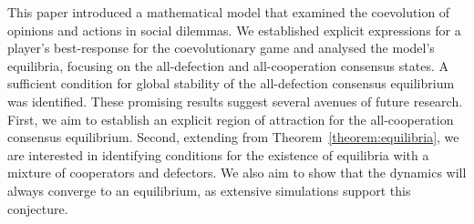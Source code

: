 \documentclass[letterpaper, 10 pt, conference]{ieeeconf}  %
\begin{document}
This paper introduced a mathematical model that examined the coevolution of opinions and actions in social dilemmas. We established explicit expressions for a player's best-response for the coevolutionary game and analysed the model's equilibria, focusing on the all-defection and all-cooperation consensus states. A sufficient condition for global stability of the all-defection consensus equilibrium was identified. These promising results suggest several avenues of future research. First, we aim to establish an explicit region of attraction for the all-cooperation consensus equilibrium. Second, extending from Theorem~\ref{theorem:equilibria}, we are interested in identifying conditions for the existence of equilibria with a mixture of cooperators and defectors. We also aim to show that the dynamics will always converge to an equilibrium, as extensive simulations support this conjecture.

\end{document}
